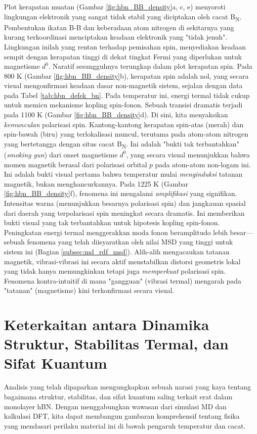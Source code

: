 Plot kerapatan muatan (Gambar \ref{fig:hbn_BB_density}a, c, e) menyoroti lingkungan elektronik yang sangat tidak stabil yang diciptakan oleh cacat B\textsubscript{N}.
Pembentukan ikatan B-B dan keberadaan atom nitrogen di sekitarnya yang kurang terkoordinasi menciptakan keadaan elektronik yang "tidak jenuh".
Lingkungan inilah yang rentan terhadap pemisahan spin, menyediakan keadaan sempit dengan kerapatan tinggi di dekat tingkat Fermi yang diperlukan untuk magnetisme $d^0$.
Naratif sesungguhnya terungkap dalam plot kerapatan spin. Pada 800 K (Gambar \ref{fig:hbn_BB_density}b), kerapatan spin adalah nol, yang secara visual mengonfirmasi keadaan dasar non-magnetik sistem, sejalan dengan data pada Tabel \ref{tab:hbn_defek_bn}.
Pada temperatur ini, energi termal tidak cukup untuk memicu mekanisme kopling spin-fonon.
Sebuah transisi dramatis terjadi pada 1100 K (Gambar \ref{fig:hbn_BB_density}d). Di sini, kita menyaksikan \emph{kemunculan} polarisasi spin.
Kantong-kantong kerapatan spin-atas (merah) dan spin-bawah (biru) yang terlokalisasi muncul, terutama pada atom-atom nitrogen yang bertetangga dengan situs cacat B\textsubscript{N}.
Ini adalah "bukti tak terbantahkan" (\emph{smoking gun}) dari onset magnetisme $d^0$, yang secara visual menunjukkan bahwa momen magnetik berasal dari polarisasi orbital $p$ pada atom-atom non-logam ini.
Ini adalah bukti visual pertama bahwa temperatur mulai \emph{menginduksi} tatanan magnetik, bukan menghancurkannya.
Pada 1225 K (Gambar \ref{fig:hbn_BB_density}f), fenomena ini mengalami \emph{amplifikasi} yang signifikan.
Intensitas warna (menunjukkan besarnya polarisasi spin) dan jangkauan spasial dari daerah yang terpolarisasi spin meningkat secara dramatis.
Ini memberikan bukti visual yang tak terbantahkan untuk hipotesis kopling spin-fonon.
Peningkatan energi termal menggerakkan moda fonon beramplitudo lebih besar—sebuah fenomena yang telah diisyaratkan oleh nilai MSD yang tinggi untuk sistem ini (Bagian \ref{subsec:md_rdf_msd}).
Alih-alih mengacaukan tatanan magnetik, vibrasi-vibrasi ini secara aktif menstabilkan distorsi geometris lokal yang tidak hanya memungkinkan tetapi juga \emph{memperkuat} polarisasi spin.
Fenomena kontra-intuitif di mana "gangguan" (vibrasi termal) mengarah pada "tatanan" (magnetisme) kini terkonfirmasi secara visual.

\section{Keterkaitan antara Dinamika Struktur, Stabilitas Termal, dan Sifat Kuantum}
\label{sec:diskusi_komprehensif}
Analisis yang telah dipaparkan mengungkapkan sebuah narasi yang kaya tentang bagaimana struktur, stabilitas, dan sifat kuantum saling terkait erat dalam monolayer hBN.
Dengan menggabungkan wawasan dari simulasi MD dan kalkulasi DFT, kita dapat membangun gambaran komprehensif tentang fisika yang mendasari perilaku material ini di bawah pengaruh temperatur dan cacat.
